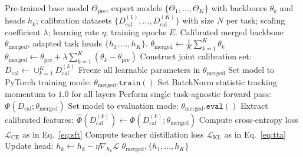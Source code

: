 \documentclass{article}
\theoremstyle{plain}
\theoremstyle{definition}
\theoremstyle{remark}
\begin{document}
\begin{algorithm*}[t]
  \caption{Sparsity-Preserving Joint Alignment (SPJA)}
  \label{alg:spja}
  \begin{algorithmic}[1]
     Pre-trained base model $\Theta_{\text{pre}}$, expert models $\{\Theta_1, \dots, \Theta_K\}$ with backbones $\theta_k$ and heads $h_k$; calibration datasets $\{D_{\text{cal}}^{(1)}, \dots, D_{\text{cal}}^{(K)}\}$ with size $N$ per task; scaling coefficient $\lambda$; learning rate $\eta$; training epochs $E$.
     Calibrated merged backbone $\theta_{\text{merged}}$, adapted task heads $\{h_1, \dots, h_K\}$.
    \STATE {}
      \STATE $\theta_{\text{merged}} \leftarrow \frac{1}{K} \sum_{k=1}^K \theta_k$
      \STATE $\theta_{\text{merged}} \leftarrow \theta_{\text{pre}} + \lambda \sum_{k=1}^K (\theta_k - \theta_{\text{pre}})$
    \ENDIF
    \STATE {}
    \STATE Construct joint calibration set: $D_{\text{cal}} \leftarrow \cup_{k=1}^K D_{\text{cal}}^{(k)}$
    \STATE Freeze all learnable parameters in $\theta_{\text{merged}}$
    \STATE Set model to PyTorch training mode: $\theta_{\text{merged}}.\mathtt{train()}$
    \STATE Set BatchNorm statistic tracking momentum to $1.0$ for all layers
    \STATE Perform single task-agnostic forward pass: $\Phi(D_{\text{cal}}; \theta_{\text{merged}})$
    \STATE {}
    \STATE Set model to evaluation mode: $\theta_{\text{merged}}.\mathtt{eval()}$
    \STATE {}
      \STATE Extract calibrated features: $\hat{\Phi}(D_{\text{cal}}^{(k)}) \leftarrow \Phi(D_{\text{cal}}^{(k)}; \theta_{\text{merged}})$
          \STATE Compute cross-entropy loss $\mathcal{L}_{\text{CE}}$ as in Eq.~\ref{eq:sft}
          \STATE Compute teacher distillation loss $\mathcal{L}_{\text{KL}}$ as in Eq.~\ref{eq:tta}
        \ENDIF
        \STATE Update head: $h_k \leftarrow h_k - \eta \nabla_{h_k} \mathcal{L}$
      \ENDFOR
    \ENDFOR
     $\theta_{\text{merged}}, \{h_1, \dots, h_K\}$
  \end{algorithmic}
\end{algorithm*}
\end{document}
